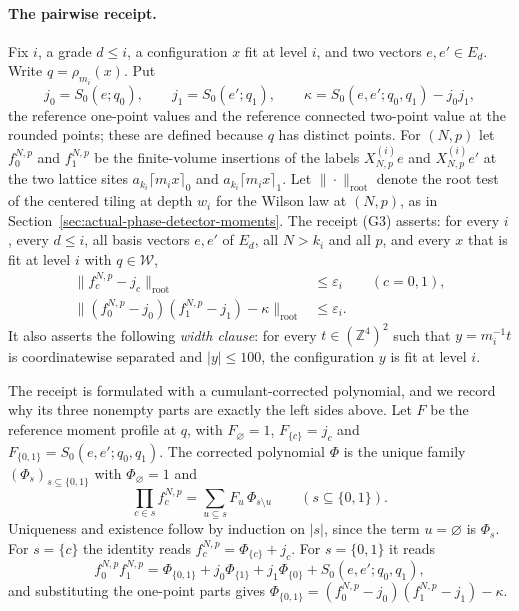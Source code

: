 \paragraph{The pairwise receipt.}
Fix $i$, a grade $d\le i$, a configuration $x$ fit at level $i$, and two
vectors $e,e'\in E_d$. Write $q=\rho_{m_i}(x)$. Put
\[
 j_0=S_0(e;q_0),\qquad j_1=S_0(e';q_1),\qquad
 \kappa=S_0(e,e';q_0,q_1)-j_0j_1,
\]
the reference one-point values and the reference connected two-point
value at the rounded points; these are defined because $q$ has distinct
points. For $(N,p)$ let $f_0^{N,p}$ and $f_1^{N,p}$ be the finite-volume
insertions of the labels $X^{(i)}_{N,p}e$ and $X^{(i)}_{N,p}e'$ at the
two lattice sites $a_{k_i}\lceil m_ix\rceil_0$ and
$a_{k_i}\lceil m_ix\rceil_1$. Let $\|\cdot\|_{\mathrm{root}}$ denote the
root test of the centered tiling at depth $w_i$ for the Wilson law at
$(N,p)$, as in
Section~\ref{sec:actual-phase-detector-moments}.
The receipt (G3) asserts: for every $i$, every $d\le i$, all basis vectors
$e,e'$ of $E_d$, all $N>k_i$ and all $p$, and every $x$ that is fit at
level $i$ with $q\in\mathcal W$,
\begin{align}
 \|f_c^{N,p}-j_c\|_{\mathrm{root}}&\le\varepsilon_i\qquad(c=0,1),
 \label{eq:trace-rounded-receipt-one}\\
 \|(f_0^{N,p}-j_0)(f_1^{N,p}-j_1)-\kappa\|_{\mathrm{root}}
 &\le\varepsilon_i .
 \label{eq:trace-rounded-receipt-two}
\end{align}
It also asserts the following \emph{width clause}: for every
$t\in(\mathbb Z^4)^2$ such that $y=m_i^{-1}t$ is coordinatewise separated
and $|y|\le100$, the configuration $y$ is fit at level $i$.

The receipt is formulated with a cumulant-corrected polynomial, and we
record why its three nonempty parts are exactly the left sides above. Let
$F$ be the reference moment profile at $q$, with
$F_\varnothing=1$, $F_{\{c\}}=j_c$ and $F_{\{0,1\}}=S_0(e,e';q_0,q_1)$.
The corrected polynomial $\Phi$ is the unique family
$(\Phi_s)_{s\subseteq\{0,1\}}$ with $\Phi_\varnothing=1$ and
\[
 \prod_{c\in s}f_c^{N,p}=\sum_{u\subseteq s}F_u\,\Phi_{s\setminus u}
 \qquad(s\subseteq\{0,1\}).
\]
Uniqueness and existence follow by induction on $|s|$, since the term
$u=\varnothing$ is $\Phi_s$. For $s=\{c\}$ the identity reads
$f_c^{N,p}=\Phi_{\{c\}}+j_c$. For $s=\{0,1\}$ it reads
\[
 f_0^{N,p}f_1^{N,p}=\Phi_{\{0,1\}}+j_0\Phi_{\{1\}}+j_1\Phi_{\{0\}}
     +S_0(e,e';q_0,q_1),
\]
and substituting the one-point parts gives
$\Phi_{\{0,1\}}=(f_0^{N,p}-j_0)(f_1^{N,p}-j_1)-\kappa$.

